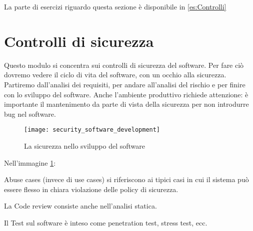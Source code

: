 La parte di esercizi riguardo questa sezione è disponibile in \ref{es:Controlli}

\part{Controlli di sicurezza}

Questo modulo si concentra sui controlli di sicurezza del software. Per fare ciò 
dovremo vedere il ciclo di vita del software, con un occhio alla sicurezza.
Partiremo dall'analisi dei requisiti, per andare all'analisi del rischio e per 
finire con lo sviluppo del software.
Anche l'ambiente produttivo richiede attenzione: è importante il mantenimento da 
parte di vista della sicurezza per non introdurre bug nel software.

\begin{figure}[h!]
        \begin{center}
                \texttt{[image: security\_software\_development]}
        \end{center}
        \caption{La sicurezza nello sviluppo del software}
        \label{fig:security:software:development}
\end{figure}



Nell'immagine \ref{fig:security:software:development}:

\begin{enumerate*}[label=\alph*)]
	\item Abuse cases (invece di use cases) si riferiscono ai  tipici 
	casi in cui il sistema può essere flesso in chiara violazione delle
	policy di sicurezza. 
	\item La Code review consiste anche nell'analisi statica.
	\item Il Test sul software è inteso come penetration test, stress test, ecc.
\end{enumerate*}







